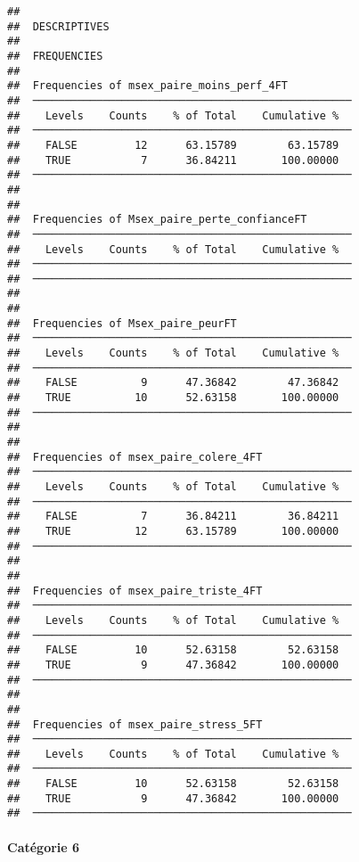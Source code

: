 \documentclass[
]{article}
\begin{document}
\begin{verbatim}
## 
##  DESCRIPTIVES
## 
##  FREQUENCIES
## 
##  Frequencies of msex_paire_moins_perf_4FT           
##  ────────────────────────────────────────────────── 
##    Levels    Counts    % of Total    Cumulative %   
##  ────────────────────────────────────────────────── 
##    FALSE         12      63.15789        63.15789   
##    TRUE           7      36.84211       100.00000   
##  ────────────────────────────────────────────────── 
## 
## 
##  Frequencies of Msex_paire_perte_confianceFT        
##  ────────────────────────────────────────────────── 
##    Levels    Counts    % of Total    Cumulative %   
##  ────────────────────────────────────────────────── 
##  ────────────────────────────────────────────────── 
## 
## 
##  Frequencies of Msex_paire_peurFT                   
##  ────────────────────────────────────────────────── 
##    Levels    Counts    % of Total    Cumulative %   
##  ────────────────────────────────────────────────── 
##    FALSE          9      47.36842        47.36842   
##    TRUE          10      52.63158       100.00000   
##  ────────────────────────────────────────────────── 
## 
## 
##  Frequencies of msex_paire_colere_4FT               
##  ────────────────────────────────────────────────── 
##    Levels    Counts    % of Total    Cumulative %   
##  ────────────────────────────────────────────────── 
##    FALSE          7      36.84211        36.84211   
##    TRUE          12      63.15789       100.00000   
##  ────────────────────────────────────────────────── 
## 
## 
##  Frequencies of msex_paire_triste_4FT               
##  ────────────────────────────────────────────────── 
##    Levels    Counts    % of Total    Cumulative %   
##  ────────────────────────────────────────────────── 
##    FALSE         10      52.63158        52.63158   
##    TRUE           9      47.36842       100.00000   
##  ────────────────────────────────────────────────── 
## 
## 
##  Frequencies of msex_paire_stress_5FT               
##  ────────────────────────────────────────────────── 
##    Levels    Counts    % of Total    Cumulative %   
##  ────────────────────────────────────────────────── 
##    FALSE         10      52.63158        52.63158   
##    TRUE           9      47.36842       100.00000   
##  ──────────────────────────────────────────────────
\end{verbatim}

\hypertarget{catuxe9gorie-6}{%
\paragraph{Catégorie 6}\label{catuxe9gorie-6}}
\end{document}
